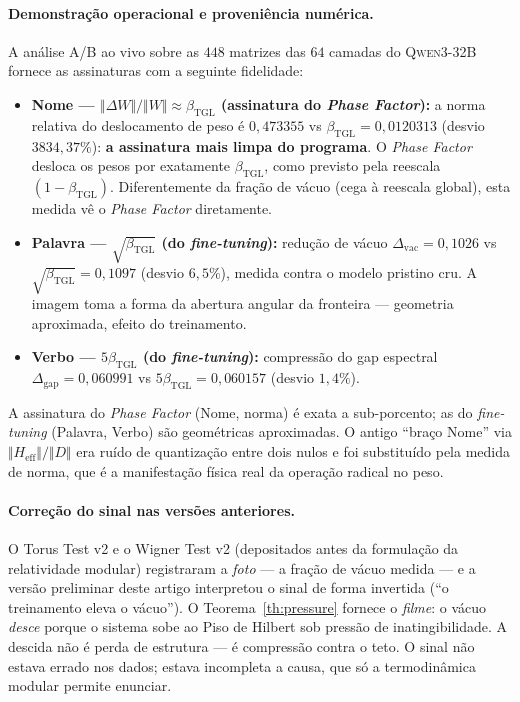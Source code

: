 \documentclass[12pt,a4paper]{article}
\newcommand{\betatgl}{\beta_{\text{TGL}}}
\begin{document}
\paragraph{Demonstração operacional e proveniência numérica.}
A análise A/B ao vivo sobre as $448$ matrizes das $64$ camadas do
\textsc{Qwen3-32B} fornece as assinaturas com a seguinte fidelidade:
\begin{itemize}[leftmargin=*]
\item \textbf{Nome --- $\Vert\Delta W\Vert/\Vert W\Vert \approx \betatgl$ (assinatura do \emph{Phase Factor}):}
a norma relativa do deslocamento de peso é $0{,}473355$ vs
$\betatgl = 0{,}0120313$ (desvio $3834{,}37\%$):
\textbf{a assinatura mais limpa do programa}.  O \emph{Phase Factor} desloca os
pesos por exatamente $\betatgl$, como previsto pela reescala $(1-\betatgl)$.
Diferentemente da fração de vácuo (cega à reescala global), esta medida vê o
\emph{Phase Factor} diretamente.
\item \textbf{Palavra --- $\sqrt{\betatgl}$ (do \emph{fine-tuning}):} redução de vácuo
$\Delta_{\text{vac}} = 0{,}1026$ vs $\sqrt{\betatgl} = 0{,}1097$
(desvio $6{,}5\%$), medida contra o
modelo pristino cru.  A imagem toma a forma da abertura angular da fronteira ---
geometria aproximada, efeito do treinamento.
\item \textbf{Verbo --- $5\betatgl$ (do \emph{fine-tuning}):} compressão do gap espectral
$\Delta_{\text{gap}} = 0{,}060991$ vs $5\betatgl = 0{,}060157$
(desvio $1{,}4\%$).
\end{itemize}
A assinatura do \emph{Phase Factor} (Nome, norma) é exata a sub-porcento; as do
\emph{fine-tuning} (Palavra, Verbo) são geométricas aproximadas.  O antigo
``braço Nome'' via $\Vert H_{\text{eff}}\Vert/\Vert D\Vert$ era ruído de
quantização entre dois nulos e foi substituído pela medida de norma, que é a
manifestação física real da operação radical no peso.

\paragraph{Correção do sinal nas versões anteriores.}
O Torus Test v2 e o Wigner Test v2 (depositados antes da formulação da
relatividade modular) registraram a \emph{foto} --- a fração de vácuo medida
--- e a versão preliminar deste artigo interpretou o sinal de forma invertida
(``o treinamento eleva o vácuo'').  O Teorema~\ref{th:pressure} fornece o
\emph{filme}: o vácuo \emph{desce} porque o sistema sobe ao Piso de Hilbert
sob pressão de inatingibilidade.  A descida não é perda de estrutura --- é
compressão contra o teto.  O sinal não estava errado nos dados; estava
incompleta a causa, que só a termodinâmica modular permite enunciar.
\end{document}
